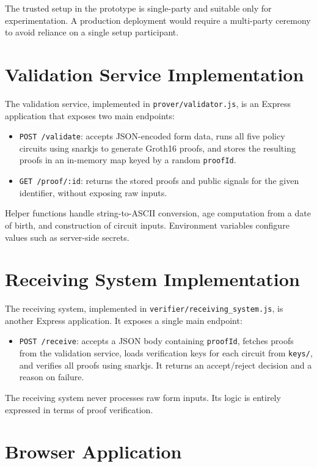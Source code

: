 The trusted setup in the prototype is single-party and suitable only for
experimentation. A production deployment would require a multi-party ceremony
to avoid reliance on a single setup participant.

\section{Validation Service Implementation}

The validation service, implemented in \texttt{prover/validator.js}, is an
Express application that exposes two main endpoints:

\begin{itemize}[leftmargin=*]
  \item \texttt{POST /validate}: accepts JSON-encoded form data, runs all five
    policy circuits using snarkjs to generate Groth16 proofs, and stores the
    resulting proofs in an in-memory map keyed by a random \texttt{proofId}.
  \item \texttt{GET /proof/:id}: returns the stored proofs and public signals
    for the given identifier, without exposing raw inputs.
\end{itemize}

Helper functions handle string-to-ASCII conversion, age computation from a date
of birth, and construction of circuit inputs. Environment variables configure
values such as server-side secrets.

\section{Receiving System Implementation}

The receiving system, implemented in \texttt{verifier/receiving\_system.js}, is
another Express application. It exposes a single main endpoint:

\begin{itemize}[leftmargin=*]
  \item \texttt{POST /receive}: accepts a JSON body containing \texttt{proofId},
    fetches proofs from the validation service, loads verification keys for each
    circuit from \texttt{keys/}, and verifies all proofs using snarkjs. It
    returns an accept/reject decision and a reason on failure.
\end{itemize}

The receiving system never processes raw form inputs. Its logic is entirely
expressed in terms of proof verification.

\section{Browser Application}

